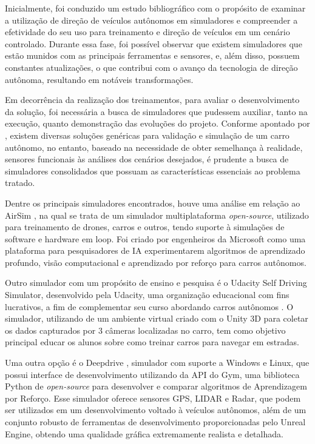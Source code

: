 \documentclass[a4paper,12pt,Times]{article}
\begin{document}
Inicialmente, foi conduzido um estudo bibliográfico com o propósito de examinar a utilização de direção de veículos autônomos em simuladores e compreender a efetividade do seu uso para treinamento e direção de veículos em um cenário controlado. Durante essa fase, foi possível observar que existem simuladores que estão munidos com as principais ferramentas e sensores, e, além disso, possuem constantes atualizações, o que contribui com o avanço da tecnologia de direção autônoma, resultando em notáveis transformações.

Em decorrência da realização dos treinamentos, para avaliar o desenvolvimento da solução, foi necessária a busca de simuladores que pudessem auxiliar, tanto na execução, quanto demonstração das evoluções do projeto. Conforme apontado por , existem diversas soluções genéricas para validação e simulação de um carro autônomo, no entanto, baseado na necessidade de obter semelhança à realidade, sensores funcionais às análises dos cenários desejados, é prudente a busca de simuladores consolidados que possuam as características essenciais ao problema tratado.

Dentre os principais simuladores encontrados, houve uma análise em relação ao AirSim \cite{airsim2017fsr}, na qual se trata de um simulador multiplataforma \textit{open-source}, utilizado para treinamento de drones, carros e outros, tendo suporte à simulações de software e hardware em loop. Foi criado por engenheiros da Microsoft como uma plataforma para pesquisadores de IA experimentarem algoritmos de aprendizado profundo, visão computacional e aprendizado por reforço para carros autônomos.

Outro simulador com um propósito de ensino e pesquisa é o Udacity Self Driving Simulator, desenvolvido pela Udacity, uma organização educacional com fins lucrativos, a fim de complementar seu curso abordando carros autônomos \cite{udacity-sim}. O simulador, utilizando de um ambiente virtual criado com o Unity 3D para coletar os dados capturados por 3 câmeras localizadas no carro, tem como objetivo principal educar os alunos sobre como treinar carros para navegar em estradas. 

Uma outra opção é o Deepdrive \cite{deepdrive}, simulador com suporte a Windows e Linux, que possui interface de desenvolvimento utilizando da API do Gym, uma biblioteca Python de \textit{open-source} para desenvolver e comparar algoritmos de Aprendizagem por Reforço. Esse simulador oferece sensores GPS, LIDAR e Radar, que podem ser utilizados em um desenvolvimento voltado à veículos autônomos, além de um conjunto robusto de ferramentas de desenvolvimento proporcionadas pelo Unreal Engine, obtendo uma qualidade gráfica extremamente realista e detalhada.
\end{document}
